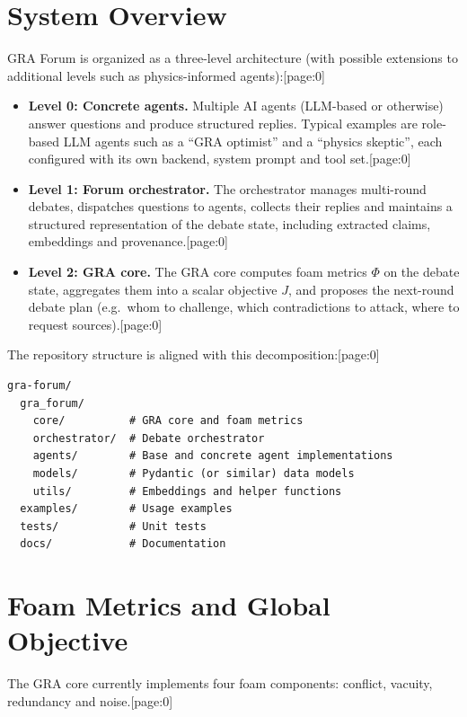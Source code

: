 \documentclass[11pt]{article}
\begin{document}
\section{System Overview}

GRA Forum is organized as a three-level architecture (with possible extensions to additional levels such as physics-informed agents):[page:0]

\begin{itemize}[leftmargin=1.5em]
\item \textbf{Level 0: Concrete agents.}
Multiple AI agents (LLM-based or otherwise) answer questions and produce structured replies.
Typical examples are role-based LLM agents such as a ``GRA optimist'' and a ``physics skeptic'', each configured with its own backend, system prompt and tool set.[page:0]

\item \textbf{Level 1: Forum orchestrator.}
The orchestrator manages multi-round debates, dispatches questions to agents, collects their replies and maintains a structured representation of the debate state, including extracted claims, embeddings and provenance.[page:0]

\item \textbf{Level 2: GRA core.}
The GRA core computes foam metrics \(\Phi\) on the debate state, aggregates them into a scalar objective \(J\), and proposes the next-round debate plan (e.g.\ whom to challenge, which contradictions to attack, where to request sources).[page:0]
\end{itemize}

The repository structure is aligned with this decomposition:[page:0]

\begin{verbatim}
gra-forum/
  gra_forum/
    core/          # GRA core and foam metrics
    orchestrator/  # Debate orchestrator
    agents/        # Base and concrete agent implementations
    models/        # Pydantic (or similar) data models
    utils/         # Embeddings and helper functions
  examples/        # Usage examples
  tests/           # Unit tests
  docs/            # Documentation
\end{verbatim}

\section{Foam Metrics and Global Objective}

The GRA core currently implements four foam components: conflict, vacuity, redundancy and noise.[page:0]
\end{document}
